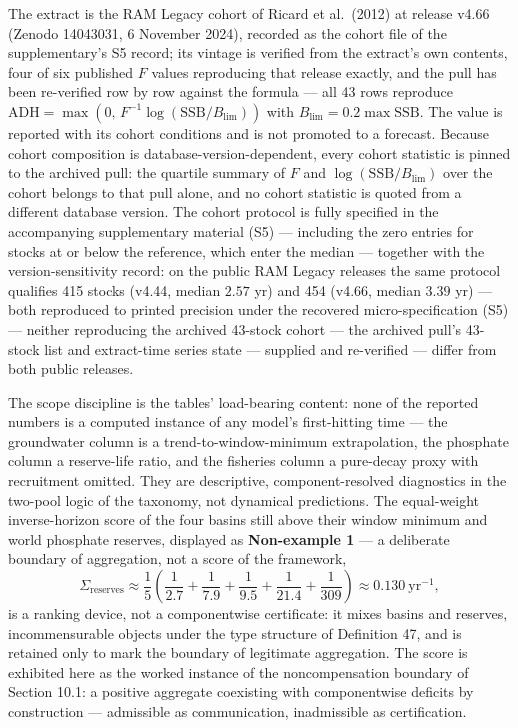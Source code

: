 \documentclass[11pt]{article}
\begin{document}
The extract is the RAM Legacy cohort of Ricard et al.~(2012) at release v4.66 (Zenodo
14043031, 6 November 2024), recorded as the cohort file of the supplementary's S5 record; its vintage is
verified from the extract's own contents, four of six published \(F\) values reproducing that release
exactly, and the pull has been re-verified row by row against the formula --- all 43 rows
reproduce
\(\mathrm{ADH} = \max(0,\, F^{-1}\log(\mathrm{SSB}/B_{\lim}))\) with
\(B_{\lim} = 0.2 \max \mathrm{SSB}\). The value is reported with its
cohort conditions and is not promoted to a forecast. Because cohort
composition is database-version-dependent, every cohort statistic is
pinned to the archived pull: the quartile summary of \(F\) and
\(\log(\mathrm{SSB}/B_{\lim})\) over the cohort belongs to that pull
alone, and no cohort statistic is quoted from a different database
version. The cohort protocol is fully specified in the accompanying
supplementary material (S5) --- including the zero entries for stocks at
or below the reference, which enter the median --- together with the
version-sensitivity record: on the public RAM Legacy releases the same
protocol qualifies 415 stocks (v4.44, median \(2.57\) yr) and 454
(v4.66, median \(3.39\) yr) --- both reproduced to printed precision
under the recovered micro-specification (S5) --- neither reproducing the
archived 43-stock cohort --- the archived pull's 43-stock list and
extract-time series state --- supplied and re-verified --- differ from
both public releases.

The scope discipline is the tables' load-bearing content: none of the
reported numbers is a computed instance of any model's first-hitting
time --- the groundwater column is a trend-to-window-minimum
extrapolation, the phosphate column a reserve-life ratio, and the
fisheries column a pure-decay proxy with recruitment omitted. They are
descriptive, component-resolved diagnostics in the two-pool logic of the
taxonomy, not dynamical predictions. The equal-weight inverse-horizon
score of the four basins still above their window minimum and world
phosphate reserves, displayed as \textbf{Non-example 1} --- a deliberate
boundary of aggregation, not a score of the framework,
\[\Sigma_{\mathrm{reserves}} \approx \frac{1}{5}\left( \frac{1}{2.7} + \frac{1}{7.9} + \frac{1}{9.5} + \frac{1}{21.4} + \frac{1}{309} \right) \approx 0.130\ \mathrm{yr}^{-1},\]
is a ranking device, not a componentwise certificate: it mixes basins
and reserves, incommensurable objects under the type structure of Definition 47,
and is retained only to mark the boundary of legitimate aggregation. The
score is exhibited here as the worked instance of the noncompensation
boundary of Section 10.1: a positive aggregate coexisting with
componentwise deficits by construction --- admissible as communication,
inadmissible as certification.
\end{document}
